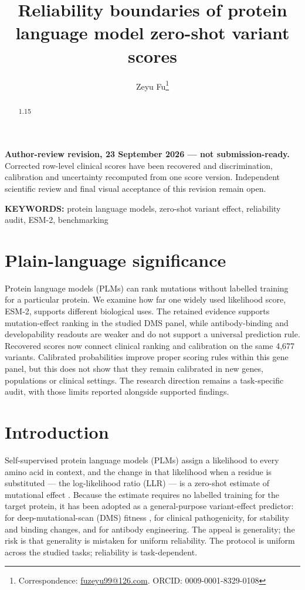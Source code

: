 \documentclass[12pt]{article}
\title{Reliability boundaries of protein language model zero-shot variant scores}
\author[1]{Zeyu Fu\thanks{Correspondence: \href{mailto:fuzeyu99@126.com}{fuzeyu99@126.com}. ORCID: 0009-0001-8329-0108}}
\affil[1]{State Key Laboratory of Trauma and Chemical Poisoning, Institute of Combined Injury, Chongqing Engineering Research Center for Nanomedicine, College of Preventive Medicine, Army Medical University, Chongqing, China}
\date{}
\begin{document}
\begingroup
\singlespacing
\maketitle
\endgroup
\linenumbers

\noindent\textbf{Author-review revision, 23 September 2026 --- not submission-ready.}
Corrected row-level clinical scores have been recovered and discrimination,
calibration and uncertainty recomputed from one score version. Independent
scientific review and final visual acceptance of this revision remain open.

\begin{abstract}
\begin{spacing}{1.15}

\end{spacing}
\end{abstract}

\noindent\textbf{KEYWORDS:} protein language models, zero-shot variant effect, reliability audit, ESM-2, benchmarking

\bigskip

\section*{Plain-language significance}


Protein language models (PLMs) can rank mutations without labelled training for a particular protein. We examine how far one widely used likelihood score, ESM-2, supports different biological uses. The retained evidence supports mutation-effect ranking in the studied DMS panel, while antibody-binding and developability readouts are weaker and do not support a universal prediction rule. Recovered scores now connect clinical ranking and calibration on the same 4,677 variants. Calibrated probabilities improve proper scoring rules within this gene panel, but this does not show that they remain calibrated in new genes, populations or clinical settings. The research direction remains a task-specific audit, with those limits reported alongside supported findings.


\section{Introduction}

Self-supervised protein language models (PLMs) assign a likelihood to every amino acid in context, and the change in that likelihood when a residue is substituted --- the log-likelihood ratio (LLR) --- is a zero-shot estimate of mutational effect \citep{Meier2021,Rives2021}. Because the estimate requires no labelled training for the target protein, it has been adopted as a general-purpose variant-effect predictor: for deep-mutational-scan (DMS) fitness \citep{Fowler2014,Riesselman2018}, for clinical pathogenicity, for stability and binding changes, and for antibody engineering. The appeal is generality; the risk is that generality is mistaken for uniform reliability. The protocol is uniform across the studied tasks; reliability is task-dependent.
\end{document}
